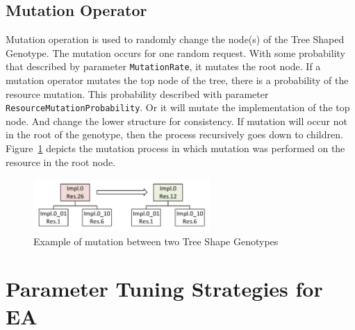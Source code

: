 \subsection{Mutation Operator}
\label{sec:GeneticSolverMutation}
Mutation operation is used to randomly change the node(s) of the Tree Shaped Genotype.
The mutation occurs for one random request. With some probability that described by parameter \texttt{MutationRate}, it mutates the root node. If a mutation operator mutates the top node of the tree, there is a probability of the resource mutation. This probability described with parameter \texttt{ResourceMutationProbability}. Or it will mutate the implementation of the top node. And change the lower structure for consistency. If mutation will occur not in the root of the genotype, then the process recursively goes down to children.  Figure~\ref{fig:GeneticSolverMutation} depicts the mutation process in which mutation was performed on the resource 
in the root node.

\begin{figure}
	\centering
	\includegraphics[width=0.6\textwidth]{images/GeneticSolverMutation.pdf}
	\caption[Mutation in Tree Shape Genotype]{Example of mutation between two Tree Shape Genotypes}
	\label{fig:GeneticSolverMutation}
\end{figure}

\section{Parameter Tuning Strategies for EA}\label{sec:Parameter Tuning Strategies}

